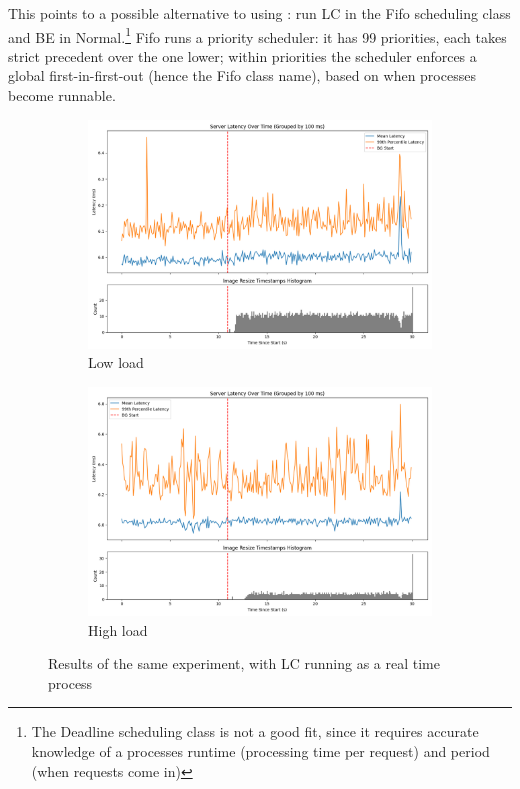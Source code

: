 This points to a possible alternative to using \cgroups{}: run LC in the Fifo
scheduling class and BE in Normal.\footnote{The Deadline scheduling class is not
a good fit, since it requires accurate knowledge of a processes runtime
(processing time per request) and period (when requests come in)} Fifo runs a
priority scheduler: it has 99 priorities, each takes strict precedent over the
one lower; within priorities the scheduler enforces a global first-in-first-out
(hence the Fifo class name), based on when processes become runnable.

\begin{figure}[t]
    \centering
    \begin{subfigure}[t]{0.48\columnwidth}
        \includegraphics[width=\columnwidth]{graphs/srv-bg-rt-low.png}
        \caption{Low load}\label{fig:srv-bg-rt-low}
    \end{subfigure}
    \hspace{\fill}
    \begin{subfigure}[t]{0.48\columnwidth}
        \includegraphics[width=\columnwidth]{graphs/srv-bg-rt-high.png}
        \caption{High load}\label{fig:srv-bg-rt-high}
    \end{subfigure}
    \vspace{4pt}
    \caption{Results of the same experiment, with LC running as a real time process}\label{fig:srv-bg-rt}
\end{figure}

